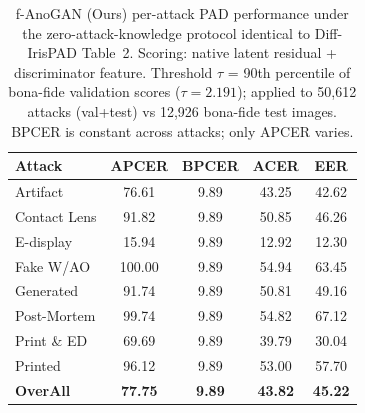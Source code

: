 \begin{table}[t]
\centering
\small
\caption{f-AnoGAN (Ours) per-attack PAD performance under the zero-attack-knowledge protocol identical to Diff-IrisPAD Table~2. Scoring: native latent residual + discriminator feature. Threshold $\tau$ = 90th percentile of bona-fide validation scores ($\tau{=}2.191$); applied to 50{,}612 attacks (val+test) vs 12{,}926 bona-fide test images. BPCER is constant across attacks; only APCER varies.}
\label{tab:fanogan_fanoganscore}
\begin{tabular}{l|cccc}
\toprule
Attack & APCER & BPCER & ACER & EER \\
\midrule
Artifact & 76.61 & 9.89 & 43.25 & 42.62 \\
Contact Lens & 91.82 & 9.89 & 50.85 & 46.26 \\
E-display & 15.94 & 9.89 & 12.92 & 12.30 \\
Fake W/AO & 100.00 & 9.89 & 54.94 & 63.45 \\
Generated & 91.74 & 9.89 & 50.81 & 49.16 \\
Post-Mortem & 99.74 & 9.89 & 54.82 & 67.12 \\
Print \& ED & 69.69 & 9.89 & 39.79 & 30.04 \\
Printed & 96.12 & 9.89 & 53.00 & 57.70 \\
\midrule
\textbf{OverAll} & \textbf{77.75} & \textbf{9.89} & \textbf{43.82} & \textbf{45.22} \\
\bottomrule
\end{tabular}
\end{table}
